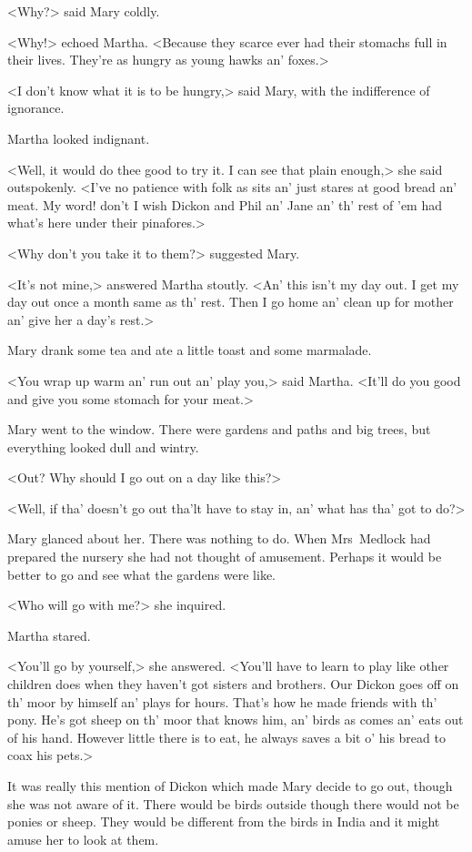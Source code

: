 <Why?> said Mary coldly.

<Why!> echoed Martha. <Because they scarce ever had their stomachs full in their lives. They're as hungry as young hawks an' foxes.>

<I don't know what it is to be hungry,> said Mary, with the indifference of ignorance.

Martha looked indignant.

<Well, it would do thee good to try it. I can see that plain enough,> she said outspokenly. <I've no patience with folk as sits an' just stares at good bread an' meat. My word! don't I wish Dickon and Phil an' Jane an' th' rest of 'em had what's here under their pinafores.>

<Why don't you take it to them?> suggested Mary.

<It's not mine,> answered Martha stoutly. <An' this isn't my day out. I get my day out once a month same as th' rest. Then I go home an' clean up for mother an' give her a day's rest.>

Mary drank some tea and ate a little toast and some marmalade.

<You wrap up warm an' run out an' play you,> said Martha. <It'll do you good and give you some stomach for your meat.>

Mary went to the window. There were gardens and paths and big trees, but everything looked dull and wintry.

<Out? Why should I go out on a day like this?>

<Well, if tha' doesn't go out tha'lt have to stay in, an' what has tha' got to do?>

Mary glanced about her. There was nothing to do. When Mrs~Medlock had prepared the nursery she had not thought of amusement. Perhaps it would be better to go and see what the gardens were like.

<Who will go with me?> she inquired.

Martha stared.

<You'll go by yourself,> she answered. <You'll have to learn to play like other children does when they haven't got sisters and brothers. Our Dickon goes off on th' moor by himself an' plays for hours. That's how he made friends with th' pony. He's got sheep on th' moor that knows him, an' birds as comes an' eats out of his hand. However little there is to eat, he always saves a bit o' his bread to coax his pets.>

It was really this mention of Dickon which made Mary decide to go out, though she was not aware of it. There would be birds outside though there would not be ponies or sheep. They would be different from the birds in India and it might amuse her to look at them.

